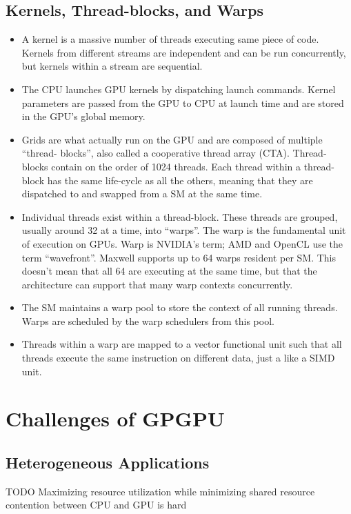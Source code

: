 \documentclass[prodmode,acmtecs]{acmsmall} %
\begin{document}
\subsection{Kernels, Thread-blocks, and Warps}
\begin{itemize}
  \item A kernel is a massive number of threads executing same piece of code.
  Kernels from different streams are independent and can be run concurrently,
  but kernels within a stream are sequential.
  \item The CPU launches GPU kernels by dispatching launch commands. Kernel
  parameters are passed from the GPU to CPU at launch time and are stored in the
  GPU's global memory.
  \item Grids are what actually run on the GPU and are composed of multiple
  ``thread- blocks'', also called a cooperative thread array (CTA). Thread-
  blocks contain on the order of 1024 threads. Each thread within a thread-block
  has the same life-cycle as all the others, meaning that they are dispatched to
  and swapped from a SM at the same time.
  \item Individual threads exist within a thread-block. These threads are
  grouped, usually around 32 at a time, into ``warps''. The warp is the
  fundamental unit of execution on GPUs. Warp is NVIDIA's term; AMD and OpenCL
  use the term ``wavefront''. Maxwell supports up to 64 warps resident per SM.
  This doesn't mean that all 64 are executing at the same time, but that the
  architecture can support that many warp contexts concurrently.
  \item The SM maintains a warp pool to store the context of all running
  threads. Warps are scheduled by the warp schedulers from this pool.
  \item Threads within a warp are mapped to a vector functional unit such that
  all threads execute the same instruction on different data, just a like a SIMD
  unit.
\end{itemize}

\section{Challenges of GPGPU} \label{sec:challenges}
\subsection{Heterogeneous Applications}
TODO
Maximizing resource utilization while minimizing shared resource contention between CPU and GPU is hard
\end{document}
